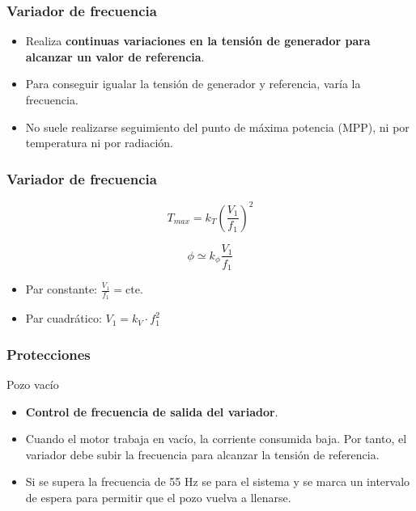 \documentclass[serif, xcolor=dvipsnames]{beamer}
\begin{document}
\begin{frame}
\frametitle{Variador de frecuencia}
\begin{itemize}
\item Realiza \textbf{continuas variaciones en la tensión de generador para
alcanzar un valor de referencia}. 
\item Para conseguir igualar la tensión de generador y referencia, varía
la frecuencia.
\item No suele realizarse seguimiento del punto de máxima potencia (MPP),
ni por temperatura ni por radiación.
\end{itemize}

\end{frame}

\begin{frame}
\frametitle{Variador de frecuencia}

\[
T_{max}=k_{T}\left(\frac{V_{1}}{f_{1}}\right)^{2}\]


\[
\phi\simeq k_{\phi}\frac{V_{1}}{f_{1}}\]

\begin{itemize}
\item Par constante: $\frac{V_{1}}{f_{1}}=\mathrm{cte.}$
\item Par cuadrático: $V_{1}=k_{V}\cdot f_{1}^{2}$
\end{itemize}

\end{frame}

\begin{frame}
\frametitle{Protecciones}
\begin{block}
{Pozo vacío}
\begin{itemize}
\item \textbf{Control de frecuencia de salida del variador}.
\item Cuando el motor trabaja en vacío, la corriente consumida baja. Por
tanto, el variador debe subir la frecuencia para alcanzar la tensión
de referencia.
\item Si se supera la frecuencia de 55 Hz se para el sistema y se marca
un intervalo de espera para permitir que el pozo vuelva a llenarse.
\end{itemize}
\end{block}

\end{frame}
\end{document}
